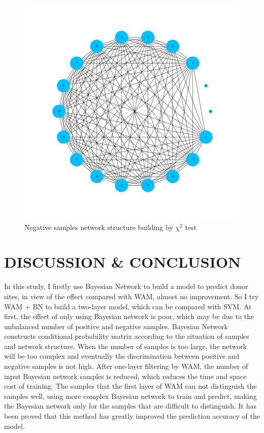 \documentclass{gapd}
\begin{document}
  \begin{figure}
  \centering
  \includegraphics[width=0.85\columnwidth]{assets/image-20210624165041495.png}
  \caption{Negative samples network structure building by \(\chi^2\) test}
  \label{fig:negative}
\end{figure}


\section{DISCUSSION \& CONCLUSION}\label{discussion--conclusion}

In this study, I firstly use Bayesian Network to build a model to
predict donor sites, in view of the effect compared with WAM, almost no
improvement. So I try WAM + BN to build a two-layer model, which can be
compared with SVM. At first, the effect of only using Bayesian network
is poor, which may be due to the unbalanced number of positive and
negative samples. Bayesian Network constructs conditional probability
matrix according to the situation of samples and network structure. When
the number of samples is too large, the network will be too complex and
eventually the discrimination between positive and negative samples is
not high. After one-layer filtering by WAM, the number of input Bayesian
network samples is reduced, which reduces the time and space cost of
training. The samples that the first layer of WAM can not distinguish
the samples well, using more complex Bayesian network to train and
predict, making the Bayesian network only for the samples that are
difficult to distinguish. It has been proved that this method has
greatly improved the prediction accuracy of the model.
\end{document}
